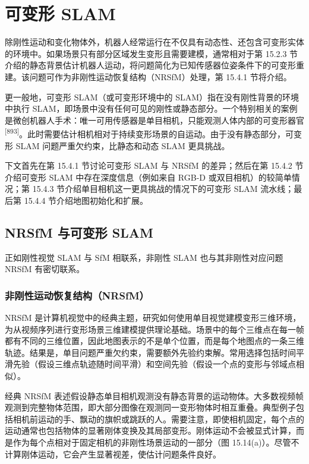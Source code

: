 \section{可变形 SLAM}

除刚性运动和变化物体外，机器人经常运行在不仅具有动态性、还包含可变形实体的环境中。如果场景只有部分区域发生变形且需要建模，通常相对于第 15.2.3 节介绍的静态背景估计机器人运动，将问题简化为已知传感器位姿条件下的可变形重建。该问题可作为非刚性运动恢复结构（NRSfM）处理，第 15.4.1 节将介绍。

更一般地，可变形 SLAM（或可变形环境中的 SLAM）指在没有刚性背景的环境中执行 SLAM，即场景中没有任何可见的刚性或静态部分。一个特别相关的案例是微创机器人手术：唯一可用传感器是单目相机，只能观测人体内部的可变形器官 \textsuperscript{[893]}。此时需要估计相机相对于持续变形场景的自运动。由于没有静态部分，可变形 SLAM 问题严重欠约束，比静态和动态 SLAM 更具挑战。

下文首先在第 15.4.1 节讨论可变形 SLAM 与 NRSfM 的差异；然后在第 15.4.2 节介绍可变形 SLAM 中存在深度信息（例如来自 RGB-D 或双目相机）的较简单情况；第 15.4.3 节介绍单目相机这一更具挑战的情况下的可变形 SLAM 流水线；最后第 15.4.4 节介绍地图初始化和扩展。

\subsection{NRSfM 与可变形 SLAM}

正如刚性视觉 SLAM 与 SfM 相联系，非刚性 SLAM 也与其非刚性对应问题 NRSfM 有密切联系。

\subsubsection{非刚性运动恢复结构（NRSfM）}

NRSfM 是计算机视觉中的经典主题，研究如何使用单目视觉建模变形三维环境，为从视频序列进行变形场景三维建模提供理论基础。场景中的每个三维点在每一帧都有不同的三维位置，因此地图表示的不是单个位置，而是每个地图点的一条三维轨迹。结果是，单目问题严重欠约束，需要额外先验约束解。常用选择包括时间平滑先验（假设三维点轨迹随时间平滑）和空间先验（假设一个点的变形与邻域点相似）。

经典 NRSfM 表述假设静态单目相机观测没有静态背景的运动物体。大多数视频帧观测到完整物体范围，即大部分图像在观测同一变形物体时相互重叠。典型例子包括相机前运动的手、飘动的旗帜或跳跃的人。需要注意，即使相机固定，每个点的运动通常也包括物体的显著刚体变换及其局部变形。刚体运动不会被显式计算，而是作为每个点相对于固定相机的非刚性场景运动的一部分（图 15.14(a)）。尽管不计算刚体运动，它会产生显著视差，使估计问题条件良好。


